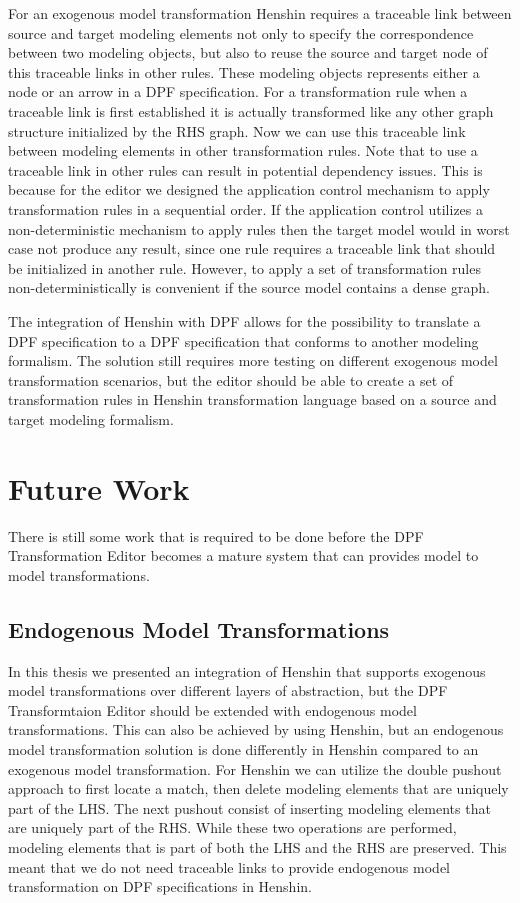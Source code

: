 For an exogenous model transformation Henshin requires a traceable
link between source and target modeling elements not only to specify the
correspondence between two modeling objects, but also to reuse the source and
target node of this traceable links in other rules. These modeling objects
represents either a node or an arrow in a DPF specification. For a
transformation rule when a traceable link is first established it is actually
transformed like any other graph structure initialized by the RHS graph. Now we
can use this traceable link between modeling elements in other transformation
rules. Note that to use a traceable link in other rules can result in potential
dependency issues. This is because for the editor we designed
the application control mechanism to apply transformation rules in a sequential
order. If the application control utilizes a non-deterministic mechanism to
apply rules then the target model would in worst case not produce any
result, since one rule requires a traceable link that should be initialized in
another rule. However, to apply a set of transformation rules
non-deterministically is convenient if the source model contains a dense graph.

The integration of Henshin with DPF allows for the possibility to translate a
DPF specification to a DPF specification that conforms to another modeling
formalism. The solution still requires more testing on different exogenous model
transformation scenarios, but the editor should be able to create a set of
transformation rules in Henshin transformation language based on a source and
target modeling formalism.

\section{Future Work}

There is still some work that is required to be done before the DPF
Transformation Editor becomes a mature system that can provides model to model
transformations.

\subsection{Endogenous Model Transformations}

In this thesis we presented an integration of Henshin that supports exogenous
model transformations over different layers of abstraction, but the DPF
Transformtaion Editor should be extended with endogenous model transformations.
This can also be achieved by using Henshin, but an endogenous model
transformation solution is done differently in Henshin compared to an exogenous
model transformation. For Henshin we can utilize the double pushout approach to
first locate a match, then delete modeling elements that are uniquely part of
the LHS. The next pushout consist of inserting modeling elements that are
uniquely part of the RHS. While these two operations are performed, modeling
elements that is part of both the LHS and the RHS are preserved. This meant that
we do not need traceable links to provide endogenous model transformation on DPF
specifications in Henshin.

